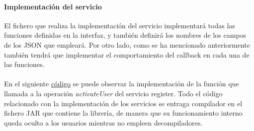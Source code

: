 \documentclass[a4paper, 12pt]{article}
\begin{document}
\paragraph{Implementación del servicio}
\label{sec-4-1-3-2}
El fichero que realiza la implementación del servicio implementará todas las funciones definidas en la interfaz, y también definirá los nombres de los campos de los JSON que empleará. Por otro lado,
como se ha mencionado anteriormente también tendrá que implementar el comportamiento del callback en cada una de las funciones.
\\
\\
En el siguiente \hyperref[code:android-implementation]{código} se puede observar
la implementación de la función que llamada a la operación \emph{activateUser} del servicio register. Todo el código relacionado con la implementación de los servicios se entraga compilador en el fichero JAR que contiene
la librería, de manera que su funcionamiento interno queda oculto a los usuarios mientras no empleen decompiladores.
\end{document}

